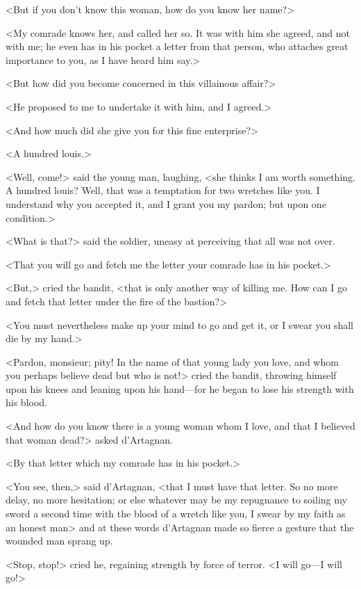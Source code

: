 <But if you don't know this woman, how do you know her name?> 

<My comrade knows her, and called her so. It was with him she agreed, and not with me; he even has in his pocket a letter from that person, who attaches great importance to you, as I have heard him say.> 

<But how did you become concerned in this villainous affair?> 

<He proposed to me to undertake it with him, and I agreed.> 

<And how much did she give you for this fine enterprise?> 

<A hundred louis.> 

<Well, come!> said the young man, laughing, <she thinks I am worth something. A hundred louis? Well, that was a temptation for two wretches like you. I understand why you accepted it, and I grant you my pardon; but upon one condition.> 

<What is that?> said the soldier, uneasy at perceiving that all was not over. 

<That you will go and fetch me the letter your comrade has in his pocket.> 

<But,> cried the bandit, <that is only another way of killing me. How can I go and fetch that letter under the fire of the bastion?> 

<You must nevertheless make up your mind to go and get it, or I swear you shall die by my hand.> 

<Pardon, monsieur; pity! In the name of that young lady you love, and whom you perhaps believe dead but who is not!> cried the bandit, throwing himself upon his knees and leaning upon his hand---for he began to lose his strength with his blood. 

<And how do you know there is a young woman whom I love, and that I believed that woman dead?> asked d'Artagnan. 

<By that letter which my comrade has in his pocket.> 

<You see, then,> said d'Artagnan, <that I must have that letter. So no more delay, no more hesitation; or else whatever may be my repugnance to soiling my sword a second time with the blood of a wretch like you, I swear by my faith as an honest man\longdash> and at these words d'Artagnan made so fierce a gesture that the wounded man sprang up. 

<Stop, stop!> cried he, regaining strength by force of terror. <I will go---I will go!> 

